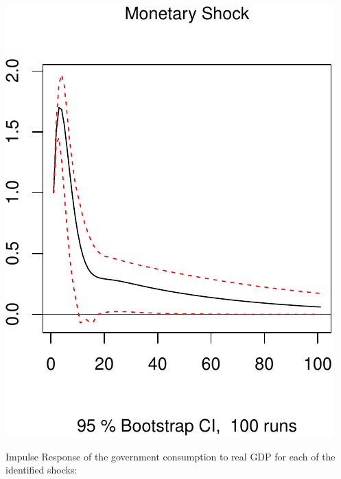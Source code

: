 \documentclass[11pt,preprint, authoryear]{elsarticle}
\numberwithin{equation}{section}
\numberwithin{figure}{section}
\numberwithin{table}{section}
\begin{document}
\includegraphics{TS_proj_files/figure-latex/unnamed-chunk-43-3.pdf}

\newpage

Impulse Response of the government consumption to real GDP for each of
the identified shocks:
\end{document}
